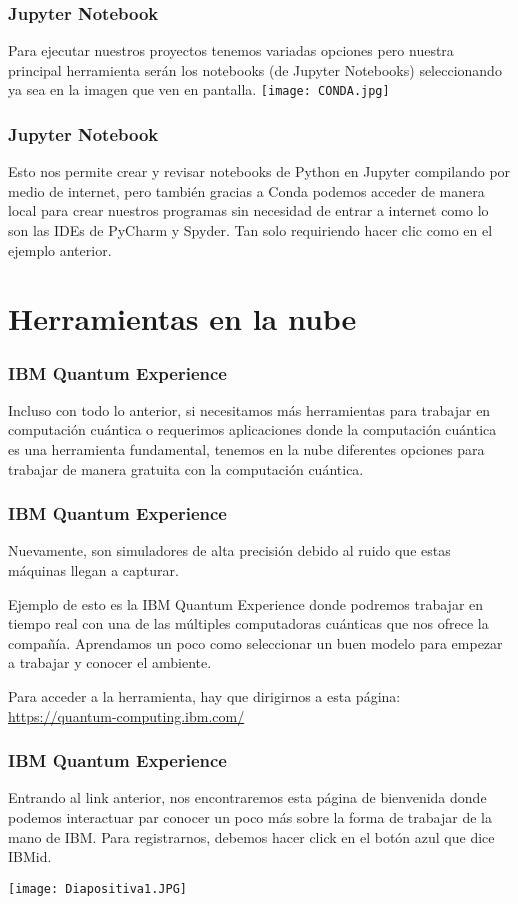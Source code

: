 \documentclass[spanish]{beamer}
\begin{document}
       
 \newpage\setlength{\parskip}{1mm}
 \begin{frame}[fragile]
 \frametitle{Jupyter Notebook} 
 \justify 
 Para ejecutar nuestros proyectos tenemos variadas opciones pero nuestra principal herramienta serán los notebooks (de Jupyter Notebooks) seleccionando ya sea en la imagen que ven en pantalla.
\centering\texttt{[image: CONDA.jpg]}
\end{frame}

 \newpage\setlength{\parskip}{1mm}
 \begin{frame}[fragile]
 \frametitle{Jupyter Notebook} 
 \justify 
Esto nos permite crear y revisar notebooks de Python en Jupyter compilando por medio de internet, pero también gracias a Conda podemos acceder de manera local para crear nuestros programas sin necesidad de entrar a internet como lo son las IDEs de PyCharm y Spyder. Tan solo requiriendo hacer clic como en el ejemplo anterior.
\end{frame}

\section{Herramientas en la nube}        
 \setlength{\parskip}{1mm}
 \begin{frame}[fragile]
 \frametitle{IBM Quantum Experience} 
 \justify    
 Incluso con todo lo anterior, si necesitamos más herramientas para trabajar en computación cuántica o requerimos aplicaciones donde la computación cuántica es una herramienta fundamental, tenemos en la nube diferentes opciones para trabajar de manera gratuita con la computación cuántica. 
  \end{frame}
 \newpage \setlength{\parskip}{1mm}
 \begin{frame}[fragile]
 \frametitle{IBM Quantum Experience} 
 \justify   
 Nuevamente, son simuladores de alta precisión debido al ruido que estas máquinas llegan a capturar.
 
 Ejemplo de esto es la IBM Quantum Experience donde podremos trabajar en tiempo real con una de las múltiples computadoras cuánticas que nos ofrece la compañía. Aprendamos un poco como seleccionar un buen modelo para empezar a trabajar y conocer el ambiente.
 
 Para acceder a la herramienta, hay que dirigirnos a esta página:  \url{https://quantum-computing.ibm.com/}

 \end{frame}
 
 \newpage\begin{frame}
 \frametitle{IBM Quantum Experience} 
 \justify 
Entrando al link anterior, nos encontraremos esta página de bienvenida donde podemos interactuar par conocer un poco más sobre la forma de trabajar de la mano de IBM. Para registrarnos, debemos hacer click en el botón azul que dice IBMid.
 
 \centering\texttt{[image: Diapositiva1.JPG]}
 \end{frame}
 
\end{document}
